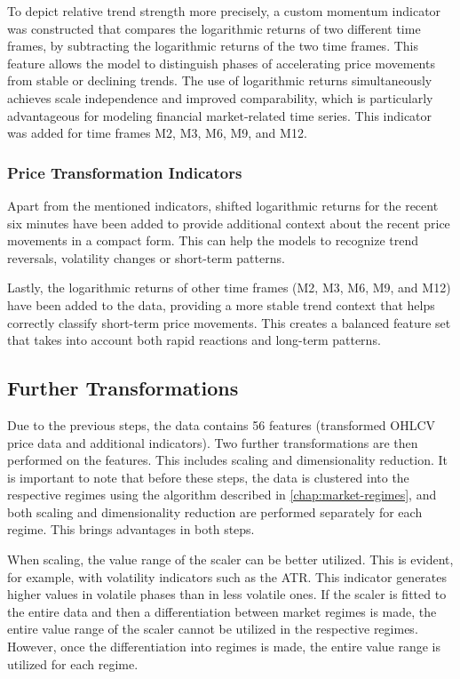 To depict relative trend strength more precisely, a custom momentum indicator was constructed that compares the logarithmic returns of two different time frames, by subtracting the logarithmic returns of the two time frames.
This feature allows the model to distinguish phases of accelerating price movements from stable or declining trends.
The use of logarithmic returns simultaneously achieves scale independence and improved comparability, which is particularly advantageous for modeling financial market-related time series.
This indicator was added for time frames M2, M3, M6, M9, and M12.

\subsubsection{Price Transformation Indicators}

Apart from the mentioned indicators, shifted logarithmic returns for the recent six minutes have been added to provide additional context about the recent price movements in a compact form.
This can help the models to recognize trend reversals, volatility changes or short-term patterns.

Lastly, the logarithmic returns of other time frames (M2, M3, M6, M9, and M12) have been added to the data, providing a more stable trend context that helps correctly classify short-term price movements.
This creates a balanced feature set that takes into account both rapid reactions and long-term patterns.

\subsection{Further Transformations}

Due to the previous steps, the data contains 56 features (transformed OHLCV price data and additional indicators).
Two further transformations are then performed on the features.
This includes scaling and dimensionality reduction.
It is important to note that before these steps, the data is clustered into the respective regimes using the algorithm described in \autoref{chap:market-regimes}, and both scaling and dimensionality reduction are performed separately for each regime.
This brings advantages in both steps.

When scaling, the value range of the scaler can be better utilized.
This is evident, for example, with volatility indicators such as the ATR.
This indicator generates higher values in volatile phases than in less volatile ones.
If the scaler is fitted to the entire data and then a differentiation between market regimes is made, the entire value range of the scaler cannot be utilized in the respective regimes.
However, once the differentiation into regimes is made, the entire value range is utilized for each regime.

